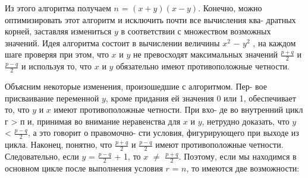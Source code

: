 Из этого алгоритма получаем $n$ = $(x + y)(x - y)$.  Конечно, можно \linebreak
оптимизировать этот алгоритм и исключить почти все вычисления ква­- \linebreak
дратных корней, заставляя измениться $y$ в соответствии с множеством \linebreak
возможных значений. Идея алгоритма состоит в вычислении величины \linebreak
$x^{2}$ $-$ $y^{2}$ , на каждом шаге проверяя при этом, что $x$ и $y$ не превосходят \linebreak
максимальных значений $\frac{p+q}{2}$ и $\frac{p-q}{2}$ и используя то, что $x$ и $y$ обязательно \linebreak
имеют противоположные четности. \ 

\vspace{3pt}Объясним некоторые изменения, произошедшие с алгоритмом. Пер­-  \linebreak
вое присваивание переменной $y$,  кроме придания ей значения 0 или 1, \linebreak
обеспечивает то, что $y$ и $x$ имеют противоположные четности. При вхо­- \linebreak
де во внутренний цикл г > п и, принимая во внимание неравенства для \linebreak
$x$ и $y$,  нетрудно доказать, что $y$ < $\frac{p-q}{2}$, а это говорит о правомочно­- \linebreak
сти условия, фигурирующего при выходе из цикла. Наконец, понятно, \linebreak
что $\frac{p+q}{2}$ и $\frac{p-q}{2}$ имеют противоположные четности. Следовательно, если \linebreak
$y$ = $\frac{p-q}{2}$ + 1, то $x$ $\ne$ $\frac{p+q}{2}$. Поэтому, если мы находимся в основном цикле \linebreak
после выполнения условия $r$ = $n$,  то имеются две возможности:

\newpage


